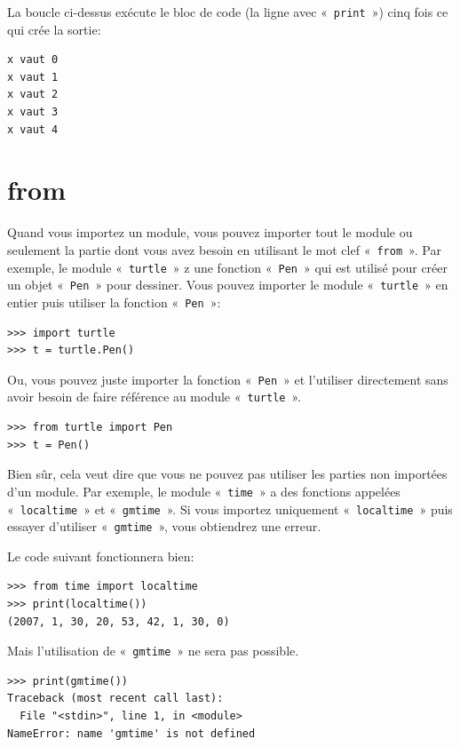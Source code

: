 La boucle ci-dessus exécute le bloc de code (la ligne avec «~\texttt{print}~») cinq fois ce qui crée la sortie:
\begin{Verbatim}[frame=single,rulecolor=\color{gray}]
x vaut 0
x vaut 1
x vaut 2
x vaut 3
x vaut 4
\end{Verbatim}

\section*{from}
Quand vous importez un module, vous pouvez importer tout le module ou seulement la partie dont vous avez besoin en utilisant le mot clef «~\texttt{from}~». Par exemple, le module «~\texttt{turtle}~» z une fonction  «~\texttt{Pen}~» qui est utilisé pour créer un objet «~\texttt{Pen}~» pour dessiner. Vous pouvez importer le module «~\texttt{turtle}~» en entier puis utiliser la fonction «~\texttt{Pen}~»:

\begin{Verbatim}[frame=single,rulecolor=\color{gray}]
>>> import turtle
>>> t = turtle.Pen()
\end{Verbatim}

Ou, vous pouvez juste importer la fonction «~\texttt{Pen}~» et l'utiliser directement sans avoir besoin de faire référence au module «~\texttt{turtle}~».

\begin{Verbatim}[frame=single,rulecolor=\color{gray}]
>>> from turtle import Pen
>>> t = Pen()
\end{Verbatim}

Bien sûr, cela veut dire que vous ne pouvez pas utiliser les parties non importées d'un module. Par exemple, le module «~\texttt{time}~» a des fonctions appelées «~\texttt{localtime}~» et «~\texttt{gmtime}~». Si vous importez uniquement «~\texttt{localtime}~» puis essayer d'utiliser «~\texttt{gmtime}~», vous obtiendrez une erreur.

Le code suivant fonctionnera bien:
\begin{Verbatim}[frame=single,rulecolor=\color{gray}]
>>> from time import localtime
>>> print(localtime())
(2007, 1, 30, 20, 53, 42, 1, 30, 0)
\end{Verbatim}

Mais l'utilisation de «~\texttt{gmtime}~» ne sera pas possible. 
\begin{Verbatim}[frame=single,rulecolor=\color{gray}]
>>> print(gmtime())
Traceback (most recent call last):
  File "<stdin>", line 1, in <module>
NameError: name 'gmtime' is not defined
\end{Verbatim}

